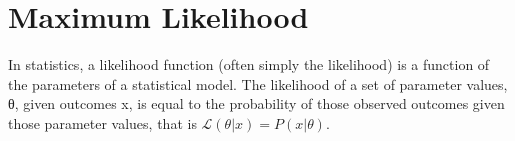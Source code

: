 
\section{Maximum Likelihood}

In statistics, a likelihood function (often simply the likelihood) is a function of the parameters of a statistical model. 
The likelihood of a set of parameter values, θ, given outcomes x, is equal to the probability of those 
observed outcomes given those parameter values, that is $\mathcal{L}(\theta |x) = P(x | \theta)$.

